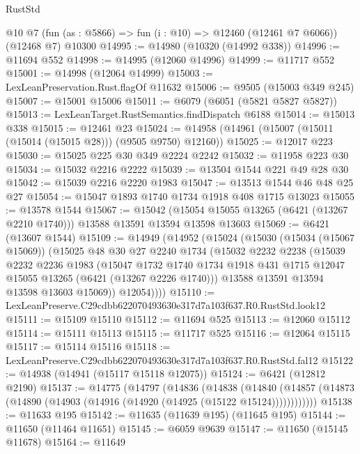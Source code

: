 \begin{lexlean}{RustStd}
\begin{coremodule}
    @10
    @7
    (fun (as : @5866) => fun (i : @10) => @12460 (@12461 @7 @6066))
    (@12468 @7)
    @10300
@14995 := @14980 (@10320 (@14992 @338))
@14996 := @11694 @552
@14998 := @14995 (@12060 @14996)
@14999 := @11717 @552
@15001 := @14998 (@12064 @14999)
@15003 := LexLeanPreservation.Rust.flagOf @11632
@15006 := @9505 (@15003 @349 @245)
@15007 := @15001 @15006
@15011 := @6079 (@6051 (@5821 @5827 @5827))
@15013 := LexLeanTarget.RustSemantics.findDispatch @6188
@15014 := @15013 @338
@15015 := @12461 @23
@15024 := @14958 (@14961 (@15007 (@15011 (@15014 (@15015 @28))) (@9505 @9750) @12160))
@15025 := @12017 @223
@15030 := @15025 @225 @30 @349 @2224 @2242
@15032 := @11958 @223 @30
@15034 := @15032 @2216 @2222
@15039 := @13504 @1544 @221 @49 @28 @30
@15042 := @15039 @2216 @2220 @1983
@15047 := @13513 @1544 @46 @48 @25 @27
@15054 := @15047 @1893 @1740 @1734 @1918 @408 @1715 @13023
@15055 := @13578 @1544
@15067 := @15042
    (@15054 @15055 @13265 (@6421 (@13267 @2210 @1740)))
    @13588
    @13591
    @13594
    @13598
    @13603
@15069 := @6421 (@13607 @1544)
@15109 := @14949
    (@14952
      (@15024
        (@15030
          (@15034 (@15067 @15069))
          (@15025
            @48
            @30
            @27
            @2240
            @1734
            (@15032
              @2232
              @2238
              (@15039
                @2232
                @2236
                @1983
                (@15047
                  @1732
                  @1740
                  @1734
                  @1918
                  @431
                  @1715
                  @12047
                  @15055
                  @13265
                  (@6421 (@13267 @2226 @1740)))
                @13588
                @13591
                @13594
                @13598
                @13603
                @15069))
            @12054))))
@15110 := LexLeanPreserve.C29cdbb622070493630e317d7a103f637.R0.RustStd.look12
@15111 := @15109 @15110
@15112 := @11694 @525
@15113 := @12060 @15112
@15114 := @15111 @15113
@15115 := @11717 @525
@15116 := @12064 @15115
@15117 := @15114 @15116
@15118 := LexLeanPreserve.C29cdbb622070493630e317d7a103f637.R0.RustStd.fal12
@15122 := @14938 (@14941 (@15117 @15118 @12075))
@15124 := @6421 (@12812 @2190)
@15137 := @14775
    (@14797
      (@14836
        (@14838
          (@14840 (@14857 (@14873 (@14890 (@14903 (@14916 (@14920 (@14925 (@15122 @15124))))))))))))
@15138 := @11633 @195
@15142 := @11635 (@11639 @195) (@11645 @195)
@15144 := @11650 (@11464 @11651)
@15145 := @6059 @9639
@15147 := @11650 (@15145 @11678)
@15164 := @11649

\end{coremodule}
\end{lexlean}
